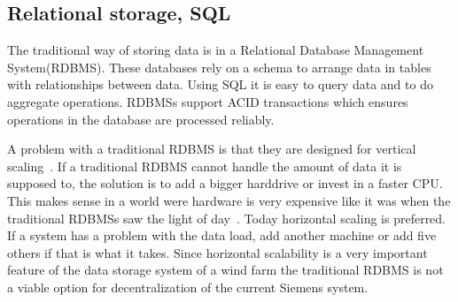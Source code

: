 \subsection{Relational storage, SQL}
\label{sec:sql}
The traditional way of storing data is in a Relational Database Management System(RDBMS).
These databases rely on a schema to arrange data in tables with relationships between data.
Using SQL it is easy to query data and to do aggregate operations.
RDBMSs support ACID transactions which ensures operations in the database are processed reliably.


A problem with a traditional RDBMS is that they are designed for vertical scaling~\cite{Atzeni:TheRelationalModelIsDead}. If a traditional RDBMS cannot handle the amount of data it is supposed to, the solution is to add a bigger harddrive or invest in a faster CPU. This makes sense in a world were hardware is very expensive like it was when the traditional RDBMSs saw the light of day~\cite{Stonebraker:TheEndOfAnArchitecturalEra}. Today horizontal scaling is preferred. If a system has a problem with the data load, add another machine or add five others if that is what it takes. Since horizontal scalability is a very important feature of the data storage system of a wind farm the traditional RDBMS is not a viable option for decentralization of the current Siemens system.

